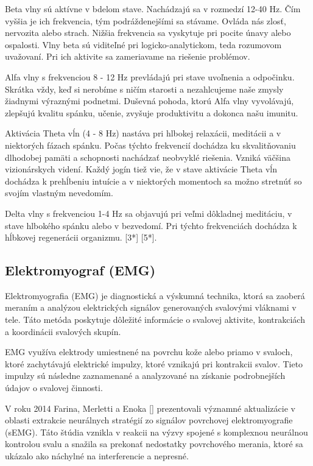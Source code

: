 \tab[5 mm]  Beta vlny sú aktívne v bdelom stave. Nachádzajú sa v rozmedzí 12-40 Hz. Čím vyššia je ich frekvencia, tým podráždenejšími sa stávame. Ovláda nás zlosť, nervozita alebo strach. Nižšia frekvencia sa vyskytuje pri pocite únavy alebo ospalosti. Vlny beta sú viditeľné pri logicko-analytickom, teda rozumovom uvažovaní. Pri ich aktivite sa zameriavame na riešenie problémov.

\tab[5 mm] Alfa vlny s frekvenciou 8 - 12 Hz prevládajú pri stave uvoľnenia a odpočinku. Skrátka vždy, keď si nerobíme s ničím starosti a nezahlcujeme naše zmysly žiadnymi výraznými podnetmi. Duševná pohoda, ktorú Alfa vlny vyvolávajú, zlepšujú kvalitu spánku, učenie, zvyšuje produktivitu a dokonca našu imunitu.

\tab[5 mm] Aktivácia Theta vĺn (4 - 8 Hz) nastáva pri hlbokej relaxácii, meditácii a v niektorých fázach spánku. Počas týchto frekvencií dochádza ku skvalitňovaniu dlhodobej pamäti a schopnosti nachádzať neobvyklé riešenia. Vzniká väčšina vizionárskych videní. Každý jogín tiež vie, že v stave aktivácie Theta vĺn dochádza k prehĺbeniu intuície a v niektorých momentoch sa možno stretnúť so svojím vlastným nevedomím.

\tab[5 mm] Delta vlny s frekvenciou 1-4 Hz sa objavujú pri veľmi dôkladnej meditáciu, v stave hlbokého spánku alebo v bezvedomí. Pri týchto frekvenciách dochádza k hĺbkovej regenerácii organizmu.
[3*] [5*].
\newpage
\subsection{Elektromyograf (EMG)}
\tab[5 mm] Elektromyografia (EMG) je diagnostická a výskumná technika, ktorá sa zaoberá meraním a analýzou elektrických signálov generovaných svalovými vláknami v tele. Táto metóda poskytuje dôležité informácie o svalovej aktivite, kontrakciách a koordinácii svalových skupín.

\tab[5 mm] EMG využíva elektrody umiestnené na povrchu kože alebo priamo v svaloch, ktoré zachytávajú elektrické impulzy, ktoré vznikajú pri kontrakcii svalov. Tieto impulzy sú následne zaznamenané a analyzované na získanie podrobnejších údajov o svalovej činnosti.

\tab[5 mm] V roku 2014 Farina, Merletti a Enoka [\cite{doi:10.1152/japplphysiol.00162.2014}] prezentovali významné aktualizácie v oblasti extrakcie neurálnych stratégií zo signálov povrchovej elektromyografie (sEMG). Táto štúdia vznikla v reakcii na výzvy spojené s komplexnou neurálnou kontrolou svalu a snažila sa prekonať nedostatky povrchového merania, ktoré sa ukázalo ako náchylné na interferencie a nepresné.

